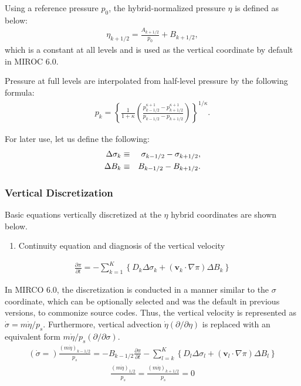 Using a reference pressure \(p_0\), the hybrid-normalized pressure \(\eta\) is defined as below: \begin{eqnarray}
\eta_{k+1/2} = \frac{A_{k+1/2}}{p_0} +B_{k+1/2},  \end{eqnarray} which is a constant at all levels and is used as the vertical coordinate by default in MIROC 6.0.

Pressure at full levels are interpolated from half-level pressure by the following formula: \begin{eqnarray}
 p_k = \left\{ \frac{1}{1+\kappa}
                     \left( \frac{  p^{\kappa +1}_{k-1/2}
                                  - p^{\kappa +1}_{k+1/2}      }
                                  { p_{k-1/2} - p_{k+1/2} }
                     \right)
              \right\}^{1/\kappa}.  \end{eqnarray}

For later use, let us define the following: \begin{eqnarray}
  \Delta\sigma_k &\equiv & \sigma_{k-1/2} - \sigma_{k+1/2}, \notag\\
  \Delta B_k &\equiv & B_{k-1/2} - B_{k+1/2}.  \end{eqnarray}

\hypertarget{vertical-discretization-1}{%
\subsubsection{Vertical Discretization}\label{vertical-discretization-1}}

Basic equations vertically discretized at the \(\eta\) hybrid coordinates are shown below.

\begin{enumerate}
\def\labelenumi{\arabic{enumi}.}
\tightlist
\item
  Continuity equation and diagnosis of the vertical velocity
\end{enumerate}

\begin{eqnarray}
  \frac{\partial \pi}{\partial t}
 = - \sum_{k=1}^{K} \left\{ D_k \Delta\sigma_k + ({\mathbf{v}}_k \cdot \nabla \pi)\Delta B_k \right\}  \end{eqnarray}

In MIRCO 6.0, the discretization is conducted in a manner similar to the \(\sigma\) coordinate, which can be optionally selected and was the default in previous versions, to commonize source codes.
Thus, the vertical velocity is represented as \(\dot{\sigma}=m\dot{\eta}/p_s\). Furthermore, vertical advection \(\dot{\eta}(\partial/\partial\eta)\) is replaced with an equivalent form
\(m\dot{\eta}/p_s(\partial/\partial\sigma)\). \begin{eqnarray}
  \left(\dot{\sigma}=\right)\frac{(m\dot{\eta})_{k-1/2}}{p_s}
 = - B_{k-1/2} \frac{\partial \pi}{\partial t}
   - \sum_{l=k}^{K}\left\{ D_l \Delta\sigma_l + ({\mathbf{v}}_l \cdot \nabla \pi)\Delta B_l \right\}  \end{eqnarray} \begin{eqnarray}
  \frac{(m\dot{\eta})_{1/2}}{p_s} = \frac{(m\dot{\eta})_{k+1/2}}{p_s} = 0  \end{eqnarray}

